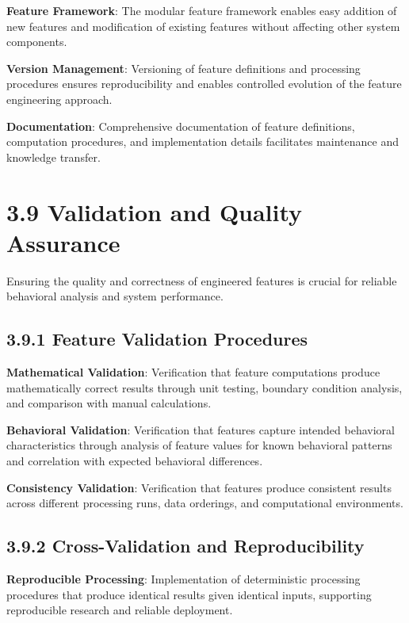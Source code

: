 \documentclass[
  12pt,
  a4paper,
]{report}
\begin{document}
\textbf{Feature Framework}: The modular feature framework enables easy
addition of new features and modification of existing features without
affecting other system components.

\textbf{Version Management}: Versioning of feature definitions and
processing procedures ensures reproducibility and enables controlled
evolution of the feature engineering approach.

\textbf{Documentation}: Comprehensive documentation of feature
definitions, computation procedures, and implementation details
facilitates maintenance and knowledge transfer.

\section{3.9 Validation and Quality
Assurance}\label{validation-and-quality-assurance}

Ensuring the quality and correctness of engineered features is crucial
for reliable behavioral analysis and system performance.

\subsection{3.9.1 Feature Validation
Procedures}\label{feature-validation-procedures}

\textbf{Mathematical Validation}: Verification that feature computations
produce mathematically correct results through unit testing, boundary
condition analysis, and comparison with manual calculations.

\textbf{Behavioral Validation}: Verification that features capture
intended behavioral characteristics through analysis of feature values
for known behavioral patterns and correlation with expected behavioral
differences.

\textbf{Consistency Validation}: Verification that features produce
consistent results across different processing runs, data orderings, and
computational environments.

\subsection{3.9.2 Cross-Validation and
Reproducibility}\label{cross-validation-and-reproducibility}

\textbf{Reproducible Processing}: Implementation of deterministic
processing procedures that produce identical results given identical
inputs, supporting reproducible research and reliable deployment.
\end{document}
